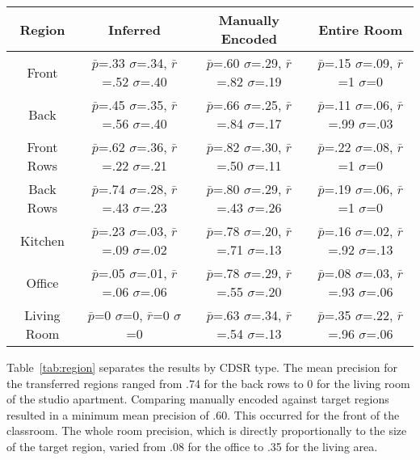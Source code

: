 
\begin{table*}
\begin{tabular}{|c|c|c|c|}
\hline
Region & Inferred & Manually Encoded & Entire Room \\
\hline
Front & $\bar{p}$=.33 $\sigma$=.34, $\bar{r}$=.52 $\sigma$=.40 & $\bar{p}$=.60 $\sigma$=.29, $\bar{r}$=.82 $\sigma$=.19  & $\bar{p}$=.15 $\sigma$=.09, $\bar{r}$=1 $\sigma$=0  \\
\hline
Back & $\bar{p}$=.45 $\sigma$=.35, $\bar{r}$=.56 $\sigma$=.40 & $\bar{p}$=.66 $\sigma$=.25, $\bar{r}$=.84 $\sigma$=.17  & $\bar{p}$=.11 $\sigma$=.06, $\bar{r}$=.99 $\sigma$=.03  \\
\hline
Front Rows & $\bar{p}$=.62 $\sigma$=.36, $\bar{r}$=.22 $\sigma$=.21 & $\bar{p}$=.82 $\sigma$=.30, $\bar{r}$=.50 $\sigma$=.11  & $\bar{p}$=.22 $\sigma$=.08, $\bar{r}$=1 $\sigma$=0  \\
\hline
Back Rows & $\bar{p}$=.74 $\sigma$=.28, $\bar{r}$=.43 $\sigma$=.23 & $\bar{p}$=.80 $\sigma$=.29, $\bar{r}$=.43 $\sigma$=.26  & $\bar{p}$=.19 $\sigma$=.06, $\bar{r}$=1 $\sigma$=0  \\
\hline
Kitchen & $\bar{p}$=.23 $\sigma$=.03, $\bar{r}$=.09 $\sigma$=.02 & $\bar{p}$=.78 $\sigma$=.20, $\bar{r}$=.71 $\sigma$=.13  & $\bar{p}$=.16 $\sigma$=.02, $\bar{r}$=.92 $\sigma$=.13  \\
\hline
Office & $\bar{p}$=.05 $\sigma$=.01, $\bar{r}$=.06 $\sigma$=.06 & $\bar{p}$=.78 $\sigma$=.29, $\bar{r}$=.55 $\sigma$=.20  & $\bar{p}$=.08 $\sigma$=.03, $\bar{r}$=.93 $\sigma$=.06  \\
\hline
Living Room & $\bar{p}$=0 $\sigma$=0, $\bar{r}$=0 $\sigma$=0 & $\bar{p}$=.63 $\sigma$=.34, $\bar{r}$=.54 $\sigma$=.13  & $\bar{p}$=.35 $\sigma$=.22, $\bar{r}$=.96 $\sigma$=.06  \\
\hline
\end{tabular}
\caption{Performance by Region Type}
  \label{tab:region}	
\end{table*}

Table~\ref{tab:region} separates the results by CDSR type. The mean precision for the transferred regions ranged from .74 for the back rows to 0 for the living room of the studio apartment. Comparing manually encoded against  target regions resulted in a minimum mean precision of .60. This  occurred for the front of the classroom. The whole room precision, which is directly proportionally to the size of the target region, varied from .08 for the office to .35 for the living area. 


